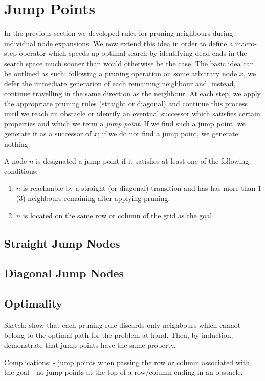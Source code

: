 \section{Jump Points}
In the previous section we developed rules for pruning neighbours during 
individual node expansions. We now extend this idea in order to define a 
macro-step operator which speeds up optimal search by identifying dead ends in the 
search space much sooner than would otherwise be the case.
The basic idea can be outlined as such:  following a pruning operation on some
arbitrary node $x$, we defer the immediate generation of each remaining
neighbour and, instead, continue travelling in the same direction as the
neighbour. At each step, we apply the appropriate pruning rules (straight or
diagonal) and continue this process until we reach an obstacle or identify an 
eventual successor which satisfies certain properties and which we term a 
\emph{jump point}.
If we find such a jump point, we generate it as a successor of $x$; if we do not 
find a jump point, we generate nothing.

\begin{definition}
A node $n$ is designated a jump point if it satisfies at least one of the following
conditions:
\begin{enumerate}
\item{$n$ is reachanble by a straight (or diagonal) transition and has
has more than 1 (3) neighbours remaining after applying pruning.}
\item{$n$ is located on the same row or column of the grid as the goal.}
\end{enumerate}
\end{definition}

\subsection{Straight Jump Nodes}


\subsection{Diagonal Jump Nodes}



\subsection{Optimality}
Sketch: show that each pruning rule discards only neighbours
which cannot belong to the optimal path for the problem at hand.
Then, by induction, demonstrate that jump points have the same 
property. 

Complications:
 - jump points when passing the row or column associated with the goal
 - no jump points at the top of a row/column ending in an obstacle.

